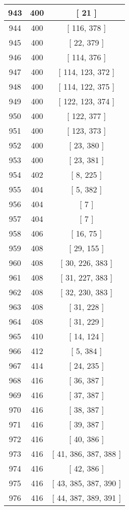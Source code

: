 \begin{center}
\begin{longtable}[H]{|| c c c ||}
\hline
943 & 400 & [ 21 ] \\ 
\hline
944 & 400 & [ 116, 378 ] \\ 
\hline
945 & 400 & [ 22, 379 ] \\ 
\hline
946 & 400 & [ 114, 376 ] \\ 
\hline
947 & 400 & [ 114, 123, 372 ] \\ 
\hline
948 & 400 & [ 114, 122, 375 ] \\ 
\hline
949 & 400 & [ 122, 123, 374 ] \\ 
\hline
950 & 400 & [ 122, 377 ] \\ 
\hline
951 & 400 & [ 123, 373 ] \\ 
\hline
952 & 400 & [ 23, 380 ] \\ 
\hline
953 & 400 & [ 23, 381 ] \\ 
\hline
954 & 402 & [ 8, 225 ] \\ 
\hline
955 & 404 & [ 5, 382 ] \\ 
\hline
956 & 404 & [ 7 ] \\ 
\hline
957 & 404 & [ 7 ] \\ 
\hline
958 & 406 & [ 16, 75 ] \\ 
\hline
959 & 408 & [ 29, 155 ] \\ 
\hline
960 & 408 & [ 30, 226, 383 ] \\ 
\hline
961 & 408 & [ 31, 227, 383 ] \\ 
\hline
962 & 408 & [ 32, 230, 383 ] \\ 
\hline
963 & 408 & [ 31, 228 ] \\ 
\hline
964 & 408 & [ 31, 229 ] \\ 
\hline
965 & 410 & [ 14, 124 ] \\ 
\hline
966 & 412 & [ 5, 384 ] \\ 
\hline
967 & 414 & [ 24, 235 ] \\ 
\hline
968 & 416 & [ 36, 387 ] \\ 
\hline
969 & 416 & [ 37, 387 ] \\ 
\hline
970 & 416 & [ 38, 387 ] \\ 
\hline
971 & 416 & [ 39, 387 ] \\ 
\hline
972 & 416 & [ 40, 386 ] \\ 
\hline
973 & 416 & [ 41, 386, 387, 388 ] \\ 
\hline
974 & 416 & [ 42, 386 ] \\ 
\hline
975 & 416 & [ 43, 385, 387, 390 ] \\ 
\hline
976 & 416 & [ 44, 387, 389, 391 ] \\ 
\hline

\end{longtable}
\end{center}
